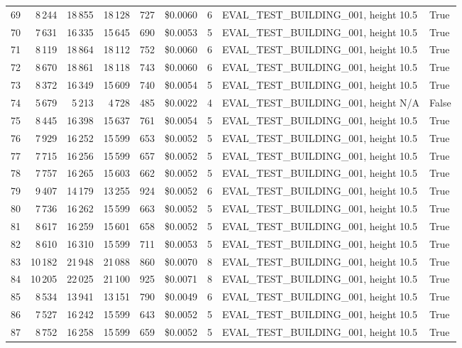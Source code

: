 \documentclass[a4paper,11pt]{article}
\begin{document}
\begin{table}[ht]
\begin{tabular}{r r r r r r r p{3cm} l}
69 & 8\,244 & 18\,855 & 18\,128 & 727 & \$0.0060 & 6 & EVAL\_TEST\_BUILDING\_001, height 10.5 & True \\
70 & 7\,631 & 16\,335 & 15\,645 & 690 & \$0.0053 & 5 & EVAL\_TEST\_BUILDING\_001, height 10.5 & True \\
71 & 8\,119 & 18\,864 & 18\,112 & 752 & \$0.0060 & 6 & EVAL\_TEST\_BUILDING\_001, height 10.5 & True \\
72 & 8\,670 & 18\,861 & 18\,118 & 743 & \$0.0060 & 6 & EVAL\_TEST\_BUILDING\_001, height 10.5 & True \\
73 & 8\,372 & 16\,349 & 15\,609 & 740 & \$0.0054 & 5 & EVAL\_TEST\_BUILDING\_001, height 10.5 & True \\
74 & 5\,679 & 5\,213 & 4\,728 & 485 & \$0.0022 & 4 & EVAL\_TEST\_BUILDING\_001, height N/A & False \\
75 & 8\,445 & 16\,398 & 15\,637 & 761 & \$0.0054 & 5 & EVAL\_TEST\_BUILDING\_001, height 10.5 & True \\
76 & 7\,929 & 16\,252 & 15\,599 & 653 & \$0.0052 & 5 & EVAL\_TEST\_BUILDING\_001, height 10.5 & True \\
77 & 7\,715 & 16\,256 & 15\,599 & 657 & \$0.0052 & 5 & EVAL\_TEST\_BUILDING\_001, height 10.5 & True \\
78 & 7\,757 & 16\,265 & 15\,603 & 662 & \$0.0052 & 5 & EVAL\_TEST\_BUILDING\_001, height 10.5 & True \\
79 & 9\,407 & 14\,179 & 13\,255 & 924 & \$0.0052 & 6 & EVAL\_TEST\_BUILDING\_001, height 10.5 & True \\
80 & 7\,736 & 16\,262 & 15\,599 & 663 & \$0.0052 & 5 & EVAL\_TEST\_BUILDING\_001, height 10.5 & True \\
81 & 8\,617 & 16\,259 & 15\,601 & 658 & \$0.0052 & 5 & EVAL\_TEST\_BUILDING\_001, height 10.5 & True \\
82 & 8\,610 & 16\,310 & 15\,599 & 711 & \$0.0053 & 5 & EVAL\_TEST\_BUILDING\_001, height 10.5 & True \\
83 & 10\,182 & 21\,948 & 21\,088 & 860 & \$0.0070 & 8 & EVAL\_TEST\_BUILDING\_001, height 10.5 & True \\
84 & 10\,205 & 22\,025 & 21\,100 & 925 & \$0.0071 & 8 & EVAL\_TEST\_BUILDING\_001, height 10.5 & True \\
85 & 8\,534 & 13\,941 & 13\,151 & 790 & \$0.0049 & 6 & EVAL\_TEST\_BUILDING\_001, height 10.5 & True \\
86 & 7\,527 & 16\,242 & 15\,599 & 643 & \$0.0052 & 5 & EVAL\_TEST\_BUILDING\_001, height 10.5 & True \\
87 & 8\,752 & 16\,258 & 15\,599 & 659 & \$0.0052 & 5 & EVAL\_TEST\_BUILDING\_001, height 10.5 & True \\

\end{tabular}
\end{table}
\end{document}
